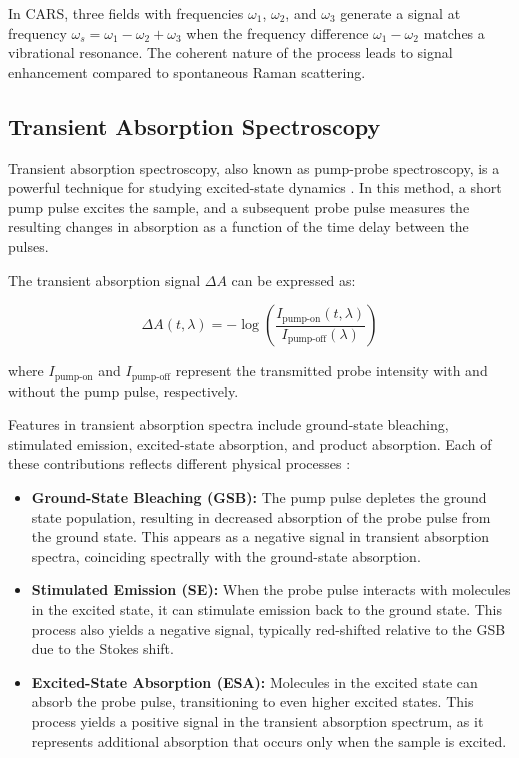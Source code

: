 \noindent In CARS, three fields with frequencies $\omega_1$, $\omega_2$, and $\omega_3$ generate a signal at frequency $\omega_s = \omega_1 - \omega_2 + \omega_3$ when the frequency difference $\omega_1 - \omega_2$ matches a vibrational resonance. The coherent nature of the process leads to signal enhancement compared to spontaneous Raman scattering.

\subsection{Transient Absorption Spectroscopy}
\label{subsec:transient_absorption}

\noindent Transient absorption spectroscopy, also known as pump-probe spectroscopy, is a powerful technique for studying excited-state dynamics \cite{Shim2006}. In this method, a short pump pulse excites the sample, and a subsequent probe pulse measures the resulting changes in absorption as a function of the time delay between the pulses.

\noindent The transient absorption signal $\Delta A$ can be expressed as:

\begin{equation}
    \Delta A(t, \lambda) = -\log\left(\frac{I_{\text{pump-on}}(t, \lambda)}{I_{\text{pump-off}}(\lambda)}\right)
    \label{eq:transient_absorption}
\end{equation}

\noindent where $I_{\text{pump-on}}$ and $I_{\text{pump-off}}$ represent the transmitted probe intensity with and without the pump pulse, respectively.

\noindent Features in transient absorption spectra include ground-state bleaching, stimulated emission, excited-state absorption, and product absorption. Each of these contributions reflects different physical processes \cite{Berera2009, Megerle2009}:

\begin{itemize}
    \item \textbf{Ground-State Bleaching (GSB):} The pump pulse depletes the ground state population, resulting in decreased absorption of the probe pulse from the ground state. This appears as a negative signal in transient absorption spectra, coinciding spectrally with the ground-state absorption.

    \item \textbf{Stimulated Emission (SE):} When the probe pulse interacts with molecules in the excited state, it can stimulate emission back to the ground state. This process also yields a negative signal, typically red-shifted relative to the GSB due to the Stokes shift.

    \item \textbf{Excited-State Absorption (ESA):} Molecules in the excited state can absorb the probe pulse, transitioning to even higher excited states. This process yields a positive signal in the transient absorption spectrum, as it represents additional absorption that occurs only when the sample is excited.
\end{itemize}

